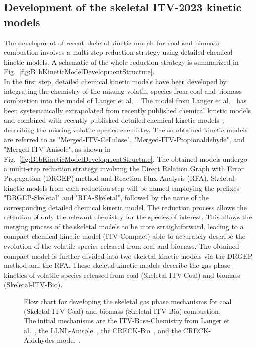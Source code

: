\begin{refsection}
\subsection{Development of the skeletal ITV-2023 kinetic models}
The development of recent skeletal kinetic models for coal and biomass combustion involves a multi-step reduction strategy using detailed chemical kinetic models. A schematic of the whole reduction strategy is summarized in Fig.~\ref{fig:B1bKineticModelDevelopmentStructure}.
\\
In the first step, detailed chemical kinetic models have been developed by integrating the chemistry of the missing volatile species from coal and biomass combustion into the model of Langer et al.~\cite{Langer2023}. The model from Langer et al.~\cite{Langer2023} has been systematically extrapolated from recently published chemical kinetic models and combined with recently published detailed chemical kinetic models~\cite{Wagnon2018, Debiagi2016, Pelucchi2015}, describing the missing volatile species chemistry. The so obtained kinetic models are referred to as "Merged-ITV-Cellulose", "Merged-ITV-Propionaldehyde", and "Merged-ITV-Anisole", as shown in Fig.~\ref{fig:B1bKineticModelDevelopmentStructure}. The obtained models undergo a multi-step reduction strategy involving the Direct Relation Graph with Error Propagation (DRGEP) method and Reaction Flux Analysis (RFA). Skeletal kinetic models from each reduction step will be named employing the prefixes "DRGEP-Skeletal" and "RFA-Skeletal", followed by the name of the corresponding detailed chemical kinetic model. The reduction process allows the retention of only the relevant chemistry for the species of interest. This allows the merging process of the skeletal models to be more straightforward, leading to a compact chemical kinetic model (ITV-Compact) able to accurately describe the evolution of the volatile species released from coal and biomass. The obtained compact model is further divided into two skeletal kinetic models via the DRGEP method and the RFA. These skeletal kinetic models describe the gas phase kinetics of volatile species released from coal (Skeletal-ITV-Coal) and biomass (Skeletal-ITV-Bio).
\begin{figure}[h]
  \centering
  \caption{Flow chart for developing the skeletal gas phase mechanisms for coal (Skeletal-ITV-Coal) and biomass (Skeletal-ITV-Bio) combustion. The initial mechanisms are the ITV-Base-Chemistry from Langer et al.~\cite{Langer2023}, the LLNL-Anisole~\cite{Wagnon2018}, the CRECK-Bio~\cite{Debiagi2016}, and the CRECK-Aldehydes model~\cite{Pelucchi2015}.}

\end{figure}
\end{refsection}
